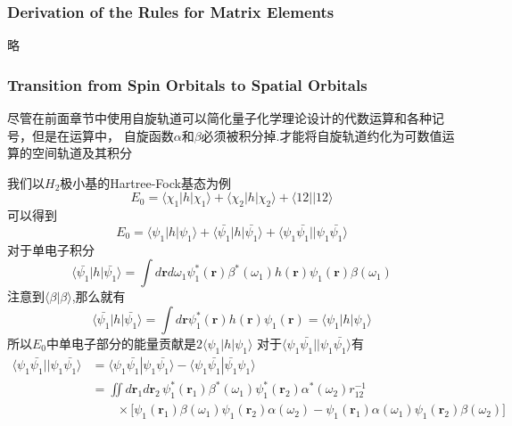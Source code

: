 \documentclass[fontset=none,12pt,a4paper]{ctexart}
\numberwithin{equation}{section}
\begin{document}
\subsubsection{Derivation of the Rules for Matrix Elements}
略
\subsubsection{Transition from Spin Orbitals to Spatial Orbitals}
\label{sec:spin-to-spatial}
尽管在前面章节中使用自旋轨道可以简化量子化学理论设计的代数运算和各种记号，但是在运算中，
自旋函数$\alpha$和$\beta$必须被积分掉.才能将自旋轨道约化为可数值运算的空间轨道及其积分

我们以$H_2$极小基的Hartree-Fock基态为例
\begin{equation}
  E_0=\langle \chi_1|h|\chi_1\rangle + \langle \chi_2|h|\chi_2\rangle + \langle 12||12\rangle
\end{equation}  
可以得到
\begin{equation}
  E_0=\langle \psi_1|h|\psi_1\rangle+\langle \bar{\psi_1}|h|\bar{\psi_1}\rangle+\langle \psi_1\bar{\psi_1}||\psi_1\bar{\psi_1}\rangle
\end{equation}
对于单电子积分
\begin{equation}
 \langle \bar{\psi_1}|h|\bar{\psi_1}\rangle=\int d\mathbf{r}d\omega_1\psi_1^*(\mathbf{r})\beta^*(\omega_1)h(\mathbf{r})\psi_1(\mathbf{r})\beta(\omega_1)
\end{equation}
注意到$\langle\beta|\beta\rangle$,那么就有
\begin{equation}
  \langle \bar{\psi_1}|h|\bar{\psi_1}\rangle=\int d\mathbf{r}\psi_1^*(\mathbf{r})h(\mathbf{r})\psi_1(\mathbf{r})=\langle \psi_1|h|\psi_1\rangle
\end{equation}
所以$E_0$中单电子部分的能量贡献是$2\langle \psi_1|h|\psi_1\rangle$
对于$\langle \psi_1\bar{\psi_1}||\psi_1\bar{\psi_1}\rangle$有
\begin{equation}
  \begin{aligned}
    \langle \psi_1\bar{\psi_1}||\psi_1\bar{\psi_1}\rangle
    &= \langle \psi_1\bar{\psi_1}|\psi_1\bar{\psi_1}\rangle - \langle \psi_1\bar{\psi_1}|\bar{\psi_1}\psi_1\rangle \\
    &= \iint d\mathbf{r}_1 d\mathbf{r}_2\, \psi_1^*(\mathbf{r}_1)\beta^*(\omega_1)\psi_1^*(\mathbf{r}_2)\alpha^*(\omega_2) r_{12}^{-1} \\
    &\qquad\times \bigl[ \psi_1(\mathbf{r}_1)\beta(\omega_1)\psi_1(\mathbf{r}_2)\alpha(\omega_2) - \psi_1(\mathbf{r}_1)\alpha(\omega_1)\psi_1(\mathbf{r}_2)\beta(\omega_2) \bigr] 
  \end{aligned}
\end{equation}
\end{document}
